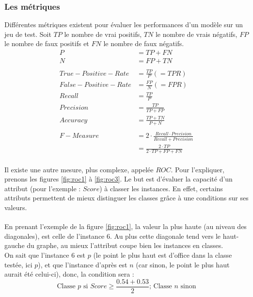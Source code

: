 \documentclass[letterpaper, 12pt]{article}
\newcommand{\alinea}{
\hspace*{0.5cm}}
\begin{document}
			\subsubsection{Les métriques}
				\alinea Différentes métriques existent pour évaluer
					les performances d'un modèle sur un jeu de test. 
					Soit $TP$ le nombre de vrai positifs, $TN$ le nombre
					de vrais négatifs, $FP$ le nombre de faux positifs
					et $FN$ le nombre de faux négatifs.
					\begin{align*}
						P &= TP + FN \\
						N &= FP + TN \\~\\
						True-Positive-Rate &= \frac{TP}{P} (=TPR) \\
						False-Positive-Rate &= \frac{FP}{N} (=FPR) \\
						Recall &= \frac{TP}{P} \\
						Precision &= \frac{TP}{TP + FP} \\
						Accuracy &= \frac{TP + TN}{P + N} \\~\\
						F-Measure &= 2 \cdot \frac{Recall \cdot Precision}%
							{Recall + Precision} \\
								  &= \frac{2 \cdot TP}{2 \cdot TP + FP + FN}
					\end{align*}
				~\\
				\alinea Il existe une autre mesure, plus complexe, appelée
					$ROC$. Pour l'expliquer, prenons les figures 
					\ref{fig:roc1} à \ref{fig:roc3}. Le but est d'évaluer
					la capacité d'un attribut (pour l'exemple : $Score$)
					à classer les instances. En effet, certains attributs 
					permettent de mieux distinguer les classes grâce à
					une conditions sur ses valeurs.\\
				~\\
				\alinea En prenant l'exemple de la figure \ref{fig:roc1},
					la valeur la plus haute (au niveau des diagonales),
					est celle de l'instance 6. Au plus cette diagonale
					tend vers le haut-gauche du graphe, au mieux l'attribut
					coupe bien les instances en classes.\\
				\alinea On sait que l'instance 6 est $p$ (le point
					le plus haut est d'office dans la classe testée, ici $p$),
					et que l'instance d'après est $n$ (car sinon, le point
					le plus haut aurait été celui-ci), donc, la condition
					sera :
					$$ \text{Classe } p \text{ si } Score \geq 
						\frac{0.54 + 0.53}{2} \text{; Classe } n 
						\text{ sinon}  $$
\end{document}
